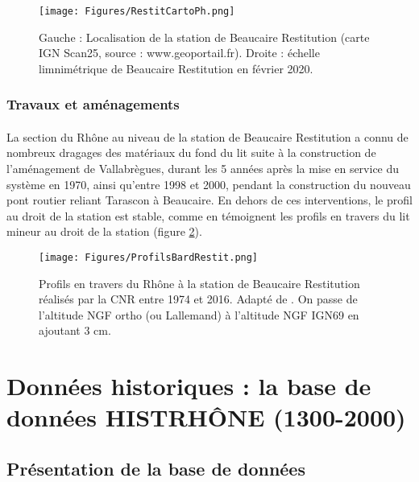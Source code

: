\documentclass[11pt]{article}
\begin{document}
	\begin{figure}[h]
	\centering
		\texttt{[image: Figures/RestitCartoPh.png]}
        \caption{Gauche : Localisation de la station de Beaucaire Restitution (carte IGN Scan25, source : www.geoportail.fr). Droite : échelle limnimétrique de Beaucaire Restitution en février 2020.}	
		\label{fig:CartoRes}
	\end{figure}
	
	
		\subsubsection{Travaux et aménagements}

	\paragraph{} La section du Rhône au niveau de la station de Beaucaire Restitution a connu de nombreux dragages des matériaux du fond du lit suite à la construction de l'aménagement de Vallabrègues, durant les 5 années après la mise en service du système en 1970, ainsi qu'entre 1998 et 2000, pendant la construction du nouveau pont routier reliant Tarascon à Beaucaire. En dehors de ces interventions, le profil au droit de la station est stable, comme en témoignent les profils en travers du lit mineur au droit de la station (figure \ref{fig:ProfilsRestit}).
	
	\begin{figure}[h]
	\centering
		\texttt{[image: Figures/ProfilsBardRestit.png]}
        \caption{Profils en travers du Rhône à la station de Beaucaire Restitution réalisés par la CNR entre 1974 et 2016. Adapté de \citet{bard_actualisation_2018}. On passe de l'altitude NGF ortho (ou Lallemand) à l'altitude NGF IGN69 en ajoutant 3 cm.}	
		\label{fig:ProfilsRestit}
	\end{figure}
	
\FloatBarrier


\section{Données historiques : la base de données HISTRHÔNE (1300-2000)}

	\subsection{Présentation de la base de données}
\end{document}
